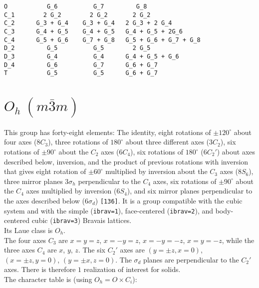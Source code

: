 \documentclass[12pt,a4paper,twoside]{report}
\begin{document}
\begin{tcolorbox}
\begin{footnotesize}
\begin{verbatim}
O           G_6          G_7         G_8
C_1        2 G_2        2 G_2       2 G_2
C_2      G_3 + G_4    G_3 + G_4   2 G_3 + 2 G_4
C_3      G_4 + G_5    G_4 + G_5   G_4 + G_5 + 2G_6  
C_4      G_5 + G_6    G_7 + G_8   G_5 + G_6 + G_7 + G_8
D_2         G_5          G_5        2 G_5
D_3         G_4          G_4      G_4 + G_5 + G_6
D_4         G_6          G_7      G_6 + G_7
T           G_5          G_5      G_6 + G_7 
\end{verbatim}
\end{footnotesize}
\end{tcolorbox}

\newpage
{\color{coral}\section{$O_h\ (m\bar3m)$}}   
\color{black}
This group has forty-eight elements: 
The identity, eight rotations of $\pm120^\circ$ about four axes ($8C_3$), 
three rotations of $180^\circ$ about three different axes ($3C_2$), six
rotations of $\pm90^\circ$ about the $C_2$ axes ($6C_4$), 
six rotations of $180^\circ$ ($6C_2'$) about axes described below, 
inversion, and the product of previous rotations with inversion that gives
eight rotation of $\pm60^\circ$ multiplied by inversion about the $C_3$ axes 
($8S_6$), three mirror planes $3\sigma_h$ perpendicular to the $C_4$ axes,
six rotations of $\pm90^\circ$ about the $C_4$ axes multiplied by inversion
($6S_4$), and six mirror planes perpendicular to the axes described
below ($6\sigma_d$) \texttt{[136]}. It is a group compatible with the 
cubic system and with the  
simple (\texttt{ibrav=1}), face-centered (\texttt{ibrav=2}), 
and body-centered cubic (\texttt{ibrav=3}) Bravais lattices. \\
Its Laue class is $O_{h}$. \\
The four axes $C_3$ are $x=y=z$, $x=-y=z$, $x=-y=-z$, $x=y=-z$, while
the three axes $C_4$ are $x$, $y$, $z$. 
The six $C_2'$ axes are $(y=\pm z, x=0)$, $(x=\pm z, y=0)$, $(y=\pm x, z=0)$.
The $\sigma_d$ planes are perpendicular to the $C_2'$ axes.
There is therefore $1$ realization of interest for solids. \\
The character table is (using $O_h=O \times C_i$):
\end{document}
